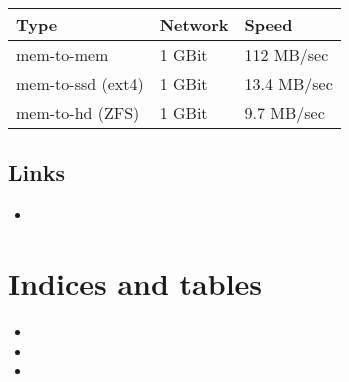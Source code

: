 \documentclass[a4paper,10pt,english]{sphinxmanual}
\begin{document}
\begin{savenotes}\sphinxattablestart
\centering
\begin{tabulary}{\linewidth}[t]{|T|T|T|}
\hline
\sphinxstyletheadfamily 
Type
&\sphinxstyletheadfamily 
Network
&\sphinxstyletheadfamily 
Speed
\\
\hline
mem-to-mem
&
1 GBit
&
112 MB/sec
\\
\hline
mem-to-ssd (ext4)
&
1 GBit
&
13.4 MB/sec
\\
\hline
mem-to-hd (ZFS)
&
1 GBit
&
9.7 MB/sec
\\
\hline
\end{tabulary}
\par
\sphinxattableend\end{savenotes}


\section{Links}
\label{\detokenize{speed:links}}\begin{itemize}
\item {} 

\end{itemize}


\chapter{Indices and tables}
\label{\detokenize{index:indices-and-tables}}\begin{itemize}
\item {} 

\item {} 

\item {} 

\end{itemize}



\renewcommand{\indexname}{Index}
\printindex
\end{document}
